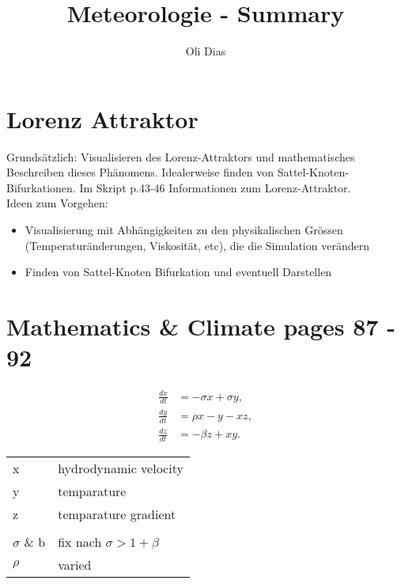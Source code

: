 \documentclass[12pt,a4paper]{article}
\author{Oli Dias}
\title{Meteorologie - Summary}
\newcommand{\dert}[1]{\frac{d#1}{dt}}
\begin{document}
	\maketitle
	\newpage
	\section{Lorenz Attraktor}
	Grundsätzlich: Visualisieren des Lorenz-Attraktors und mathematisches Beschreiben dieses Phänomens. Idealerweise finden von Sattel-Knoten-Bifurkationen. Im Skript p.43-46 Informationen zum Lorenz-Attraktor.\\

	Ideen zum Vorgehen:
	\begin{itemize}
		\item Visualisierung mit Abhängigkeiten zu den physikalischen Grössen (Temperaturänderungen, Viskosität, etc), die die Simulation verändern
		\item Finden von Sattel-Knoten Bifurkation und eventuell Darstellen
	\end{itemize}

	\section{Mathematics \& Climate pages 87 - 92}
	\begin{multicols}{2}
		\begin{subequations}
			\label{Lorenz-Equations}
			\begin{align}
				\dert{x} &= -\sigma x + \sigma y,\\
				\dert{y} &= \rho x - y - xz,\\
				\dert{z} &= -\beta z + xy.
			\end{align}
		\end{subequations}

		\begin{tabular}{l l}
			x & hydrodynamic velocity\\
			y & temparature\\
			z & temparature gradient\\
			\\
			\( \sigma \) \& b & fix nach \( \sigma > 1 + \beta \)\\
			\( \rho \) & varied\\
		\end{tabular}
	\end{multicols}
\end{document}
